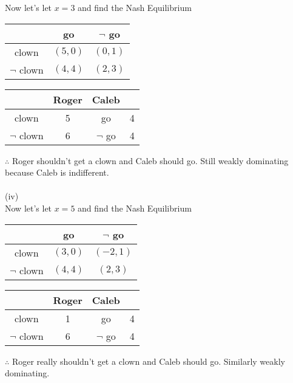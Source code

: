 \documentclass[12pt,letter]{article}
\begin{document}
Now let's let $x=3$ and find the Nash Equilibrium
\begin{figure*}[h!]
\centering
\begin{tabular}{|c|c|c|}
	\hline
	& go & $\neg$ go\\
	\hline
	clown & $(5,0)$ & $(0,1)$\\
	\hline
	$\neg$ clown & $(4,4)$ & $(2,3)$\\
	\hline
\end{tabular}
\end{figure*}
\begin{figure*}[h!]
\centering
\begin{tabular}{c c|c c}
	& Roger & Caleb\\
	\hline
	clown & 5 & go & 4\\
	$\neg$ clown & 6 & $\neg$ go & 4
\end{tabular}
\end{figure*}
\FloatBarrier
$\therefore$ Roger shouldn't get a clown and Caleb should go. Still weakly 
dominating because Caleb is indifferent.
\\
\\
(iv)\\
Now let's let $x=5$ and find the Nash Equilibrium
\begin{figure*}[h!]
\centering
\begin{tabular}{|c|c|c|}
	\hline
	& go & $\neg$ go\\
	\hline
	clown & $(3,0)$ & $(-2,1)$\\
	\hline
	$\neg$ clown & $(4,4)$ & $(2,3)$\\
	\hline
\end{tabular}
\end{figure*}
\begin{figure*}[h!]
\centering
\begin{tabular}{c c|c c}
	& Roger & Caleb\\
	\hline
	clown & 1 & go & 4\\
	$\neg$ clown & 6 & $\neg$ go & 4
\end{tabular}
\end{figure*}
\FloatBarrier
$\therefore$ Roger really shouldn't get a clown and Caleb should go. Similarly 
weakly dominating.
\end{document}
